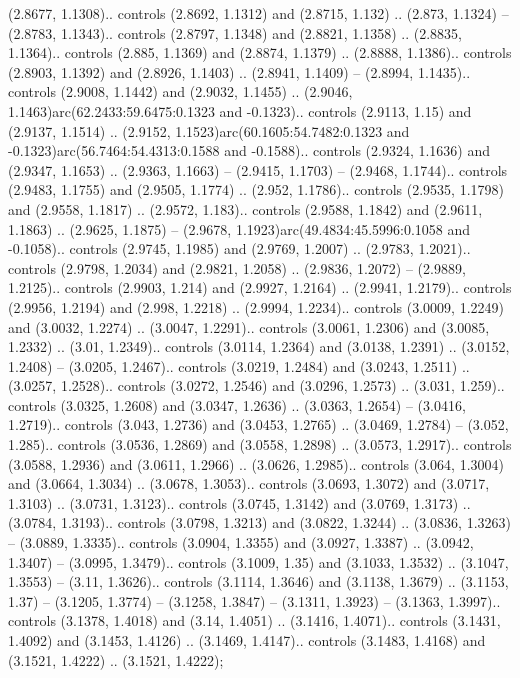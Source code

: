 (2.8677, 1.1308).. controls (2.8692, 1.1312) and (2.8715, 1.132) .. (2.873, 1.1324) -- (2.8783, 1.1343).. controls (2.8797, 1.1348) and (2.8821, 1.1358) .. (2.8835, 1.1364).. controls (2.885, 1.1369) and (2.8874, 1.1379) .. (2.8888, 1.1386).. controls (2.8903, 1.1392) and (2.8926, 1.1403) .. (2.8941, 1.1409) -- (2.8994, 1.1435).. controls (2.9008, 1.1442) and (2.9032, 1.1455) .. (2.9046, 1.1463)arc(62.2433:59.6475:0.1323 and -0.1323).. controls (2.9113, 1.15) and (2.9137, 1.1514) .. (2.9152, 1.1523)arc(60.1605:54.7482:0.1323 and -0.1323)arc(56.7464:54.4313:0.1588 and -0.1588).. controls (2.9324, 1.1636) and (2.9347, 1.1653) .. (2.9363, 1.1663) -- (2.9415, 1.1703) -- (2.9468, 1.1744).. controls (2.9483, 1.1755) and (2.9505, 1.1774) .. (2.952, 1.1786).. controls (2.9535, 1.1798) and (2.9558, 1.1817) .. (2.9572, 1.183).. controls (2.9588, 1.1842) and (2.9611, 1.1863) .. (2.9625, 1.1875) -- (2.9678, 1.1923)arc(49.4834:45.5996:0.1058 and -0.1058).. controls (2.9745, 1.1985) and (2.9769, 1.2007) .. (2.9783, 1.2021).. controls (2.9798, 1.2034) and (2.9821, 1.2058) .. (2.9836, 1.2072) -- (2.9889, 1.2125).. controls (2.9903, 1.214) and (2.9927, 1.2164) .. (2.9941, 1.2179).. controls (2.9956, 1.2194) and (2.998, 1.2218) .. (2.9994, 1.2234).. controls (3.0009, 1.2249) and (3.0032, 1.2274) .. (3.0047, 1.2291).. controls (3.0061, 1.2306) and (3.0085, 1.2332) .. (3.01, 1.2349).. controls (3.0114, 1.2364) and (3.0138, 1.2391) .. (3.0152, 1.2408) -- (3.0205, 1.2467).. controls (3.0219, 1.2484) and (3.0243, 1.2511) .. (3.0257, 1.2528).. controls (3.0272, 1.2546) and (3.0296, 1.2573) .. (3.031, 1.259).. controls (3.0325, 1.2608) and (3.0347, 1.2636) .. (3.0363, 1.2654) -- (3.0416, 1.2719).. controls (3.043, 1.2736) and (3.0453, 1.2765) .. (3.0469, 1.2784) -- (3.052, 1.285).. controls (3.0536, 1.2869) and (3.0558, 1.2898) .. (3.0573, 1.2917).. controls (3.0588, 1.2936) and (3.0611, 1.2966) .. (3.0626, 1.2985).. controls (3.064, 1.3004) and (3.0664, 1.3034) .. (3.0678, 1.3053).. controls (3.0693, 1.3072) and (3.0717, 1.3103) .. (3.0731, 1.3123).. controls (3.0745, 1.3142) and (3.0769, 1.3173) .. (3.0784, 1.3193).. controls (3.0798, 1.3213) and (3.0822, 1.3244) .. (3.0836, 1.3263) -- (3.0889, 1.3335).. controls (3.0904, 1.3355) and (3.0927, 1.3387) .. (3.0942, 1.3407) -- (3.0995, 1.3479).. controls (3.1009, 1.35) and (3.1033, 1.3532) .. (3.1047, 1.3553) -- (3.11, 1.3626).. controls (3.1114, 1.3646) and (3.1138, 1.3679) .. (3.1153, 1.37) -- (3.1205, 1.3774) -- (3.1258, 1.3847) -- (3.1311, 1.3923) -- (3.1363, 1.3997).. controls (3.1378, 1.4018) and (3.14, 1.4051) .. (3.1416, 1.4071).. controls (3.1431, 1.4092) and (3.1453, 1.4126) .. (3.1469, 1.4147).. controls (3.1483, 1.4168) and (3.1521, 1.4222) .. (3.1521, 1.4222);



